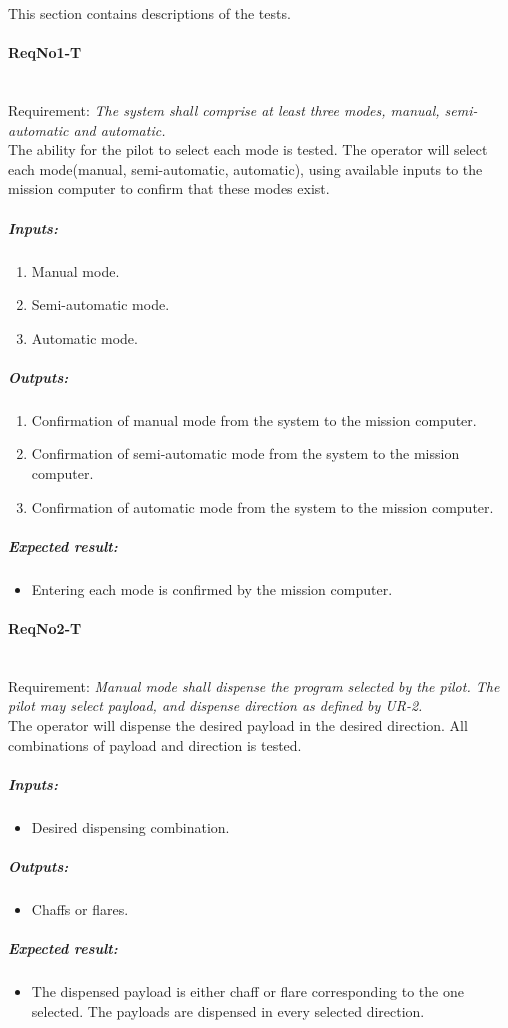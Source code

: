 This section contains descriptions of the tests.

\paragraph{ReqNo1-T}\mbox{}\\ %
Requirement: \textit{The system shall comprise at least three modes, manual, semi-automatic and automatic.}\\
The ability for the pilot to select each mode is tested. The operator will select each mode(manual, semi-automatic, automatic), using available inputs to the mission computer to confirm that these modes exist.

\subparagraph{Inputs:}
	\begin{enumerate}
	\item Manual mode.
	\item Semi-automatic mode.
	\item Automatic mode.
	\end{enumerate}
	\subparagraph{Outputs:}
	\begin{enumerate}
	\item Confirmation of manual mode from the system to the mission computer.
	\item Confirmation of semi-automatic mode from the system to the mission computer.
	\item Confirmation of automatic mode from the system to the mission computer.
	\end{enumerate}
	\subparagraph{Expected result:}
	\begin{itemize}
	\item Entering each mode is confirmed by the mission computer.
	\end{itemize}

\paragraph{ReqNo2-T}\mbox{}\\ %
Requirement: \textit{Manual mode shall dispense the program selected by the pilot. The pilot may select payload, and dispense direction as defined by UR-2.}
\\
The operator will dispense the desired payload in the desired direction. All combinations of payload and direction is tested.
\\
	\subparagraph{Inputs:}
	\begin{itemize}
	\item Desired dispensing combination.
	\end{itemize}
	\subparagraph{Outputs:}
	\begin{itemize}
	\item Chaffs or flares.
	\end{itemize}
	\subparagraph{Expected result:}
	\begin{itemize}
	\item The dispensed payload is either chaff or flare corresponding to the one selected. The payloads are dispensed in every selected direction.
	\end{itemize}

